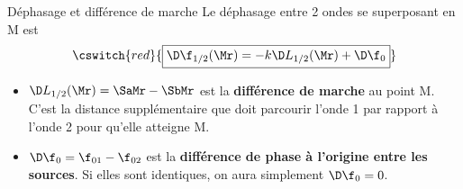 \documentclass[../main/main.tex]{subfiles}
\begin{document}
\begin{NCprop}[heart]{Déphasage et différence de marche}
    Le déphasage entre 2 ondes se superposant en M est
    \[\cswitch{red}{
        \boxed{\D\f_{1/2}(\Mr) = -k\D L_{1/2}(\Mr) + \D\f_0}
    }\]
    \begin{itemize}
        \item $\D L_{1/2}(\Mr) = \SaMr - \SbMr$ est la \textbf{différence de
            marche} au point M. C'est la distance supplémentaire que doit
            parcourir l'onde 1 par rapport à l'onde 2 pour qu'elle atteigne M.
        \item $\D\f_0 = \f_{01}-\f_{02}$ est la \textbf{différence de phase à
            l'origine entre les sources}. Si elles sont identiques, on aura
            simplement $\D\f_0 = 0$.
    \end{itemize}
\end{NCprop}
\end{document}

